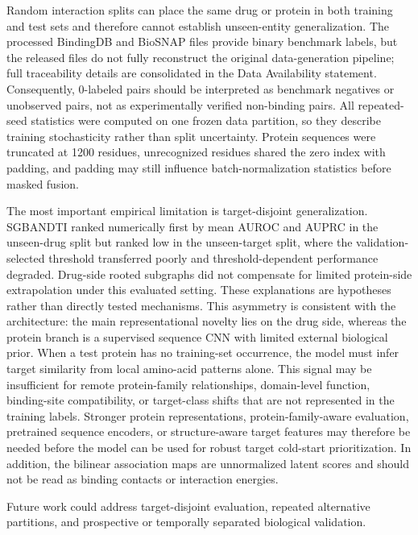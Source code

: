 \documentclass[computers,article,submit,moreauthors]{Definitions/mdpi}
\begin{document}
Random interaction splits can place the same drug or protein in both training and test sets and therefore cannot establish unseen-entity generalization. The processed BindingDB and BioSNAP files provide binary benchmark labels, but the released files do not fully reconstruct the original data-generation pipeline; full traceability details are consolidated in the Data Availability statement. Consequently, 0-labeled pairs should be interpreted as benchmark negatives or unobserved pairs, not as experimentally verified non-binding pairs. All repeated-seed statistics were computed on one frozen data partition, so they describe training stochasticity rather than split uncertainty. Protein sequences were truncated at 1200 residues, unrecognized residues shared the zero index with padding, and padding may still influence batch-normalization statistics before masked fusion.

The most important empirical limitation is target-disjoint generalization. SGBANDTI ranked numerically first by mean AUROC and AUPRC in the unseen-drug split but ranked low in the unseen-target split, where the validation-selected threshold transferred poorly and threshold-dependent performance degraded. Drug-side rooted subgraphs did not compensate for limited protein-side extrapolation under this evaluated setting. These explanations are hypotheses rather than directly tested mechanisms. This asymmetry is consistent with the architecture: the main representational novelty lies on the drug side, whereas the protein branch is a supervised sequence CNN with limited external biological prior. When a test protein has no training-set occurrence, the model must infer target similarity from local amino-acid patterns alone. This signal may be insufficient for remote protein-family relationships, domain-level function, binding-site compatibility, or target-class shifts that are not represented in the training labels. Stronger protein representations, protein-family-aware evaluation, pretrained sequence encoders, or structure-aware target features may therefore be needed before the model can be used for robust target cold-start prioritization. In addition, the bilinear association maps are unnormalized latent scores and should not be read as binding contacts or interaction energies.

Future work could address target-disjoint evaluation, repeated alternative partitions, and prospective or temporally separated biological validation.
\end{document}

